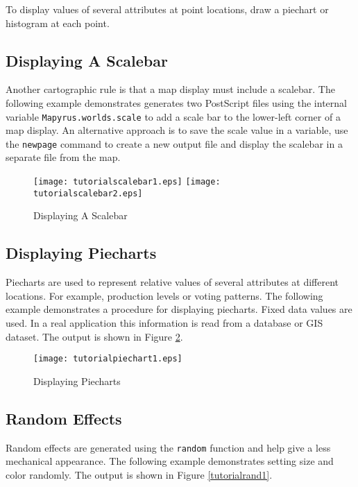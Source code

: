 To display values of several attributes at point locations, draw a
piechart or histogram at each point.

\subsection{Displaying A Scalebar}

Another cartographic rule is that a map display must include a scalebar.  The
following example demonstrates generates two PostScript files using the
internal variable \texttt{Mapyrus.worlds.scale} to add a scale bar to the
lower-left corner of a map display.  An alternative approach is to save the
scale value in a variable, use the \texttt{newpage} command to create a new
output file and display the scalebar in a separate file from the map.



\begin{figure}[h]
\texttt{[image: tutorialscalebar1.eps]}
\texttt{[image: tutorialscalebar2.eps]}
\caption{Displaying A Scalebar}
\label{tutorialscalebar1}
\end{figure}

\subsection{Displaying Piecharts}

Piecharts are used to represent relative values of several attributes at
different locations.  For example, production levels or voting patterns.  The
following example demonstrates a procedure for displaying piecharts.  Fixed
data values are used.  In a real application this information is read from a
database or GIS dataset.  The output is shown in Figure
\ref{tutorialpiechart1}.



\begin{figure}[h]
\texttt{[image: tutorialpiechart1.eps]}
\caption{Displaying Piecharts}
\label{tutorialpiechart1}
\end{figure}

\subsection{Random Effects}

Random effects are generated using the \texttt{random}
function and help give a less mechanical appearance.
The following example demonstrates setting size and color randomly.
The output is shown in Figure \ref{tutorialrand1}.

